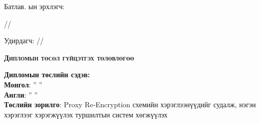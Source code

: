 
\begin{titlepage}

	\noindent Батлав. \deptname ын эрхлэгч:
	\begin{flushright}
		\makebox[6cm]{\dotfill} /\chairname/
	\end{flushright}
	Удирдагч:\makebox[6cm]{ \dotfill} /\supname/
	\begin{center}
		\vspace*{0.5cm}
		\textbf{{\large \textsc{Дипломын төсөл гүйцэтгэх төлөвлөгөө}}}\\[0.5cm]
	\end{center}
	\noindent \textbf{Дипломын төслийн сэдэв:}\\
	\textbf{Монгол}: '' \ttitle '' \\
	\textbf{Англи}: '' \ttitleng ''\\

	\noindent \textbf{Төслийн зорилго}: Proxy Re-Encryption схемийн хэрэглээнүүдийг судалж, нэгэн хэрэглээг хэрэгжүүлэх туршилтын систем хөгжүүлэх\\


\end{titlepage}
